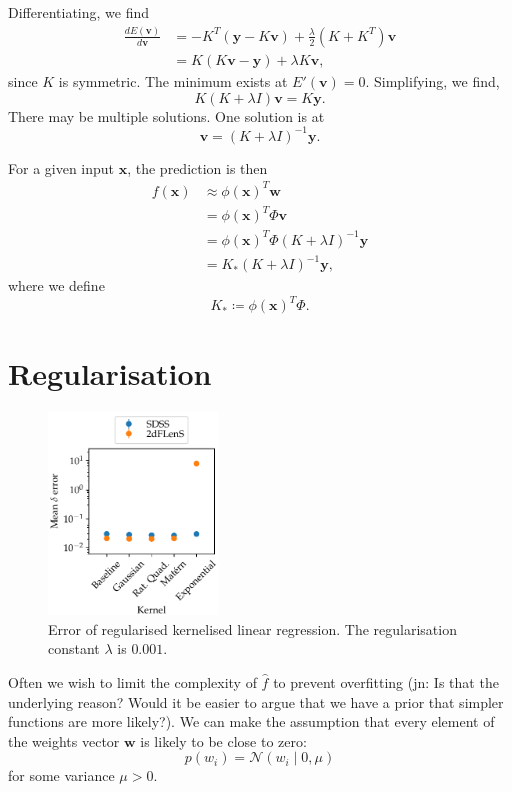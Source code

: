 \documentclass[11pt,twoside,openright]{report}
\newcommand\bv{\mathbf{v}}
\newcommand\bw{\mathbf{w}}
\newcommand\bx{\mathbf{x}}
\newcommand\by{\mathbf{y}}
\newcommand\cN{\mathcal{N}}
\newcommand\jn[1]{{\color{red}(jn: #1)}}
\begin{document}
Differentiating, we find \begin{align*}
    \frac{dE(\bv)}{d\bv} &= -K^T(\by - K\bv) + \frac{\lambda}{2} (K + K^T)\bv \\
    &= K(K\bv - \by) + \lambda K\bv \text{,}
\end{align*} since $K$ is symmetric. The minimum exists at $E'(\bv) = 0$. Simplifying, we find,\[
    K(K + \lambda I)\bv = K\by \text{.}
\] There may be multiple solutions. One solution is at \[
    \bv = (K + \lambda I)^{-1}\by \text{.}
\]

For a given input $\bx$, the prediction is then \begin{align*}
    f(\bx) &\approx \phi(\bx)^T \bw \\
    &= \phi(\bx)^T \Phi \bv \\
    &= \phi(\bx)^T \Phi (K + \lambda I)^{-1}\by \\
    &= K_* (K + \lambda I)^{-1}\by \text{,}
\end{align*} where we define \[
    K_* \coloneqq \phi(\bx)^T \Phi \text{.}
\]

\section{Regularisation}

  \begin{figure}
    \centering
    \includegraphics[width=0.4\textwidth]{linreg_kernelised_regularised.pdf}
    \caption{Error of regularised kernelised linear regression. The regularisation constant $\lambda$ is $0.001$.}
    \label{fig:linreg_kernelised_regularised}
  \end{figure}

Often we wish to limit the complexity of $\hat f$ to prevent overfitting \jn{Is that the underlying reason? Would it be easier to argue that we have a prior that simpler functions are more likely?}. We can make the assumption that every element of the weights vector $\bw$ is likely to be close to zero: \[
    p(w_i) = \cN(w_i \mid 0, \mu)
\] for some variance $\mu > 0$.
\end{document}
